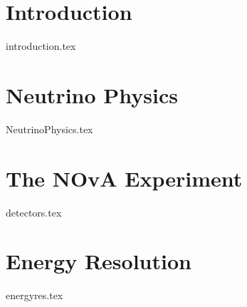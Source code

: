 \documentclass[a4paper,11pt]{report}
\newcommand{\linespacing}{1.5}
\renewcommand{\baselinestretch}{\linespacing}
\begin{document}

%
%
%

%
%
%
%
%
\newpage
{}



\chapter{Introduction}
{introduction.tex}


\chapter{Neutrino Physics}
{NeutrinoPhysics.tex}
\chapter{The NOvA Experiment}
{detectors.tex}

\chapter{Energy Resolution}
{energyres.tex}


\clearpage
{}
%

 

\end{document}
